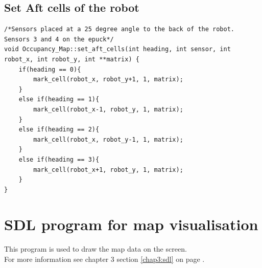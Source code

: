 \subsection{Set Aft cells of the robot}
\label{code:set_aft}

\begin{lstlisting}[caption = {Code to set cells to the aft of the robot}]
/*Sensors placed at a 25 degree angle to the back of the robot. Sensors 3 and 4 on the epuck*/
void Occupancy_Map::set_aft_cells(int heading, int sensor, int robot_x, int robot_y, int **matrix) {
    if(heading == 0){
        mark_cell(robot_x, robot_y+1, 1, matrix);
    }
    else if(heading == 1){
        mark_cell(robot_x-1, robot_y, 1, matrix);
    }
    else if(heading == 2){
        mark_cell(robot_x, robot_y-1, 1, matrix);
    }
    else if(heading == 3){
        mark_cell(robot_x+1, robot_y, 1, matrix);
    }
}
\end{lstlisting}

\section{SDL program for map visualisation}
\label{code:sdl}
This program is used to draw the map data on the screen.\\
For more information see chapter 3 section \ref{chap3:sdl} on page \pageref{chap3:sdl}.

